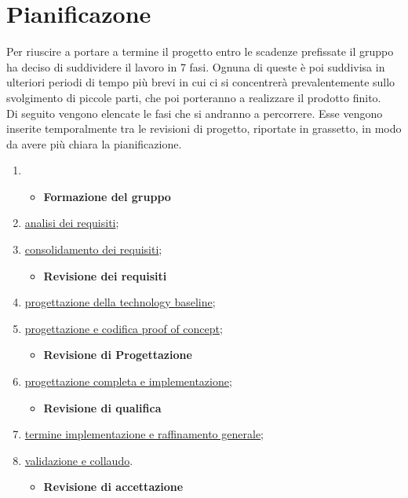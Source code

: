 \section{Pianificazone} \label{_pianificazione}
Per riuscire a portare a termine il progetto entro le scadenze prefissate il gruppo ha deciso di suddividere il lavoro in 7 fasi. Ognuna di queste è poi suddivisa in ulteriori periodi di tempo più brevi in cui ci si concentrerà prevalentemente sullo svolgimento di piccole parti, che poi porteranno a realizzare il prodotto finito.\\
Di seguito vengono elencate le fasi che si andranno a percorrere. Esse vengono inserite temporalmente tra le revisioni di progetto, riportate in grassetto, in modo da avere più chiara la pianificazione.
\begin{enumerate}
    \item []
          \begin{itemize}
              \item [] \textbf{Formazione del gruppo}
          \end{itemize}
    \item \hyperref[_pianificazioneAnalisiDeiRequisiti]{analisi dei requisiti};
    \item \hyperref[_pianificazioneConsolidamentoDeiRequisiti]{consolidamento dei requisiti};
          \begin{itemize}
              \item [] \textbf{Revisione dei requisiti}
          \end{itemize}
    \item \hyperref[_pianificazioneProgettazioneTechnologyBaseline]{progettazione della technology baseline};
    \item \hyperref[_pianificazioneCodificaPoC]{progettazione e codifica proof of concept};
          \begin{itemize}
              \item [] \textbf{Revisione di Progettazione}
          \end{itemize}
    \item \hyperref[_pianificazioneProgettazioneCompletaImplementazione]{progettazione completa e implementazione};
          \begin{itemize}
              \item [] \textbf{Revisione di qualifica}
          \end{itemize}
    \item \hyperref[_pianificazioneTermineImplementazione]{termine implementazione e raffinamento generale};
    \item \hyperref[_pianificazioneValidazioneCollaudo]{validazione e collaudo}.
          \begin{itemize}
              \item [] \textbf{Revisione di accettazione}
          \end{itemize}
\end{enumerate}

